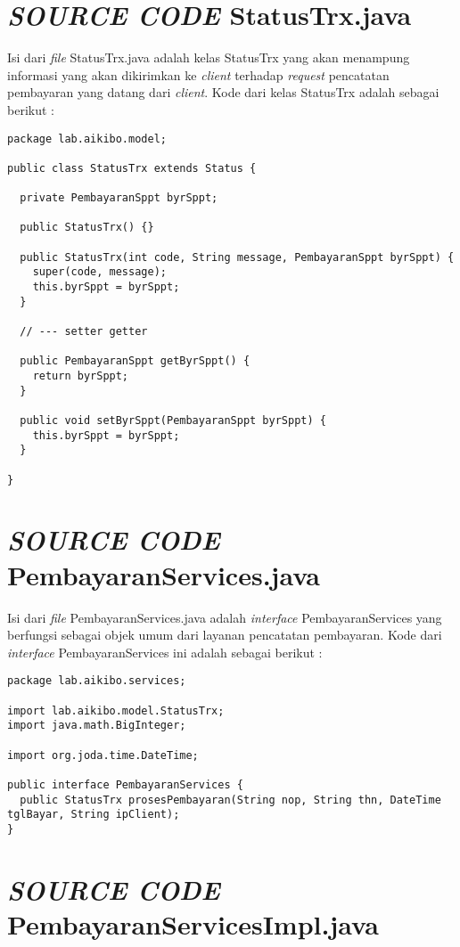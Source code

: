 \documentclass[pdftex,12pt, oneside]{article}
\begin{document}
\section{\textit{SOURCE CODE} StatusTrx.java}

Isi dari \textit{file} StatusTrx.java adalah kelas StatusTrx yang akan menampung informasi yang akan dikirimkan ke \textit{client} terhadap \textit{request} pencatatan pembayaran yang datang dari \textit{client}. Kode dari kelas StatusTrx adalah sebagai berikut :

\begin{lstlisting}
package lab.aikibo.model;

public class StatusTrx extends Status {

  private PembayaranSppt byrSppt;

  public StatusTrx() {}

  public StatusTrx(int code, String message, PembayaranSppt byrSppt) {
    super(code, message);
    this.byrSppt = byrSppt;
  }

  // --- setter getter

  public PembayaranSppt getByrSppt() {
    return byrSppt;
  }

  public void setByrSppt(PembayaranSppt byrSppt) {
    this.byrSppt = byrSppt;
  }

}
\end{lstlisting}


\section{\textit{SOURCE CODE} PembayaranServices.java}

Isi dari \textit{file} PembayaranServices.java adalah \textit{interface} PembayaranServices yang berfungsi sebagai objek umum dari layanan pencatatan pembayaran. Kode dari \textit{interface} PembayaranServices ini adalah sebagai berikut :

\begin{lstlisting}
package lab.aikibo.services;

import lab.aikibo.model.StatusTrx;
import java.math.BigInteger;

import org.joda.time.DateTime;

public interface PembayaranServices {
  public StatusTrx prosesPembayaran(String nop, String thn, DateTime tglBayar, String ipClient);
}
\end{lstlisting}


\section{\textit{SOURCE CODE} PembayaranServicesImpl.java}
\end{document}
